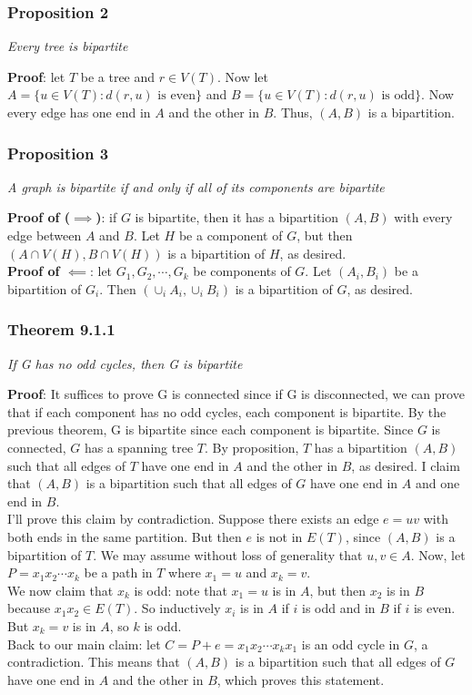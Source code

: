 \documentclass{report}
\begin{document}
\subsubsection{Proposition 2}
\begin{center}
\textit{Every tree is bipartite}
\end{center}
\textbf{Proof}: let $T$ be a tree and $r \in V(T)$. Now let $A = \{u \in V(T) : d(r,u) \,\,\mathrm{is \,\, even}\}$ and $B = \{u \in V(T) : d(r,u) \,\,\mathrm{is \,\, odd}\}$. Now every edge has one end in $A$ and the other in $B$. Thus, $(A, B)$ is a bipartition.
\subsubsection{Proposition 3}
\begin{center}
\textit{A graph is bipartite if and only if all of its components are bipartite}
\end{center}
\textbf{Proof of ($\implies$)}: if $G$ is bipartite, then it has a bipartition $(A, B)$ with every edge between $A$ and $B$. Let $H$ be a component of $G$, but then $(A\cap V(H), B \cap V(H))$ is a bipartition of $H$, as desired. \\
\textbf{Proof of $\impliedby$}: let $G_1, G_2, \cdots, G_k$ be components of $G$. Let $(A_i, B_i)$ be a bipartition of $G_i$. Then $(\cup_i A_i, \cup_{i} B_i)$ is a bipartition of $G$, as desired.
\subsubsection{Theorem 9.1.1}
\begin{center}
\textit{If G has no odd cycles, then G is bipartite}
\end{center}
\textbf{Proof}: It suffices to prove G is connected since if G is disconnected, we can prove that if each component has no odd cycles, each component is bipartite. By the previous theorem, G is bipartite since each component is bipartite.
Since $G$ is connected, $G$ has a spanning tree $T$. By proposition, $T$ has a bipartition $(A, B)$ such that all edges of $T$ have one end in $A$ and the other in $B$, as desired. I claim that $(A, B)$ is a bipartition such that all edges of $G$ have one end in $A$ and one end in $B$.\\
I'll prove this claim by contradiction. Suppose there exists an edge $e = uv$ with both ends in the same partition. But then $e$ is not in $E(T)$, since $(A,B)$ is a bipartition of $T$. We may assume without loss of generality that $u,v \in A$. Now, let $P = x_1x_2 \cdots x_k$ be a path in $T$ where $x_1 = u$ and $x_k = v$. \\We now claim that $x_k$ is odd: note that $x_1 = u$ is in $A$, but then $x_2$ is in $B$ because $x_1x_2 \in E(T)$. So inductively $x_i$ is in $A$ if $i$ is odd and in $B$ if $i$ is even. But $x_k = v$ is in $A$, so $k$ is odd.\\
Back to our main claim: let $C = P + e = x_1x_2 \cdots x_kx_1$ is an odd cycle in $G$, a contradiction. This means that $(A,B)$ is a bipartition such that all edges of $G$ have one end in $A$ and the other in $B$, which proves this statement.

\end{document}
